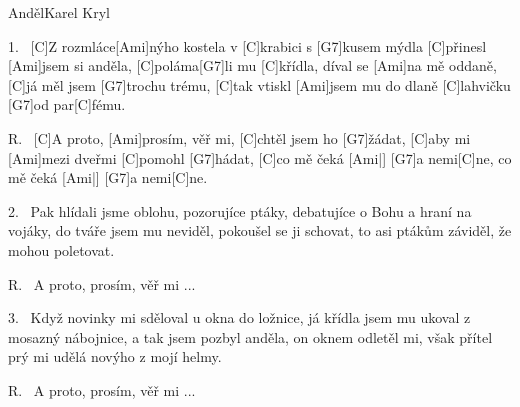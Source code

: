\begin{song}{Anděl}{Karel Kryl}

\begin{xverse}{1.~}
[C]Z rozmláce[Ami]nýho kostela v [C]krabici s [G7]kusem mýdla
[C]přinesl [Ami]jsem si anděla, [C]poláma[G7]li mu [C]křídla,
díval se [Ami]na mě oddaně, [C]já měl jsem [G7]trochu trému,
[C]tak vtiskl [Ami]jsem mu do dlaně [C]lahvičku [G7]od par[C]fému.
\end{xverse}

\begin{xverse}{R.~}
[C]A proto, [Ami]prosím, věř mi, [C]chtěl jsem ho [G7]{žá}dat,
[C]aby mi [Ami]mezi dveřmi [C]pomohl [G7]hádat,
[C]co mě čeká [Ami|]{}   [G7]a nemi[C]ne, co mě čeká [Ami|]{}   [G7]a    nemi[C]ne.
\end{xverse}

\begin{xverse}{2.~}
Pak hlídali jsme oblohu, pozorujíce ptáky,
debatujíce o Bohu a hraní na vojáky,
do tváře jsem mu neviděl, pokoušel se ji schovat,
to asi ptákům záviděl, že mohou poletovat.
\end{xverse}

\begin{xverse}{R.~}
A proto, prosím, věř mi ...
\end{xverse}

\begin{xverse}{3.~}
Když novinky mi sděloval u okna do ložnice,
já křídla jsem mu ukoval z mosazný nábojnice,
a tak jsem pozbyl anděla, on oknem odletěl mi,
však přítel prý mi udělá novýho z mojí helmy.
\end{xverse}

\begin{xverse}{R.~}
A proto, prosím, věř mi ...
\end{xverse}

\end{song}

